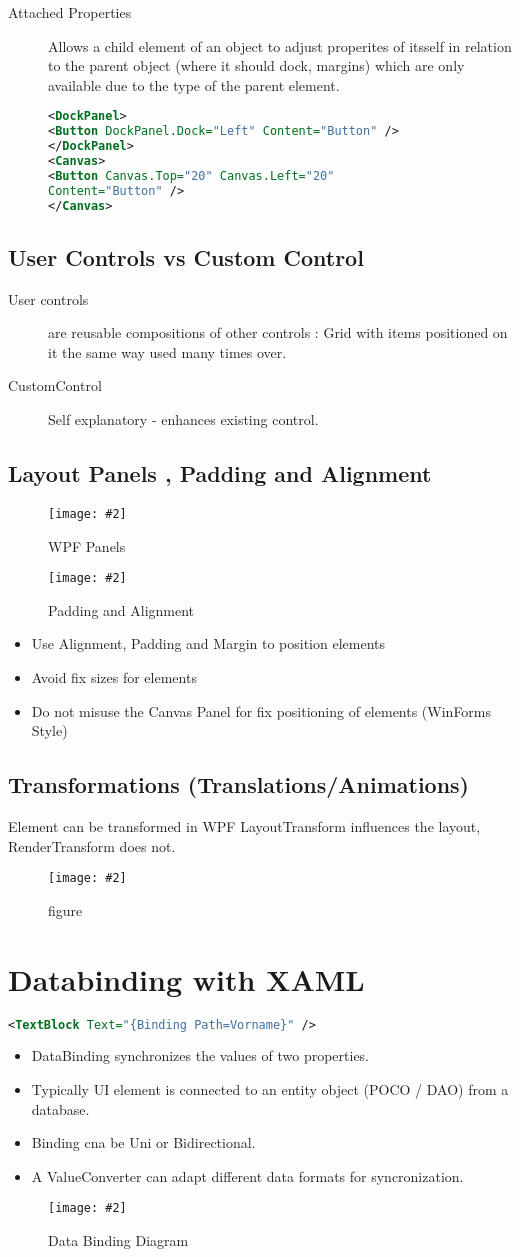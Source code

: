\documentclass[a4paper,10pt]{scrreprt}
\newcommand{\pic}[2][figure]{\begin{figure}[h]
 \centering
 \texttt{[image: \#2]}
 \caption{#1}
\end{figure}
}
\begin{document}
\begin{description}
\item[Attached Properties] Allows a child element of an object to adjust properites of itsself in relation to the parent object (where it should dock, margins) which are only available due to the type of the parent element.
\begin{lstlisting}[caption=XAML Attached Properties Example,language=xml]
<DockPanel>
<Button DockPanel.Dock="Left" Content="Button" />
</DockPanel>
<Canvas>
<Button Canvas.Top="20" Canvas.Left="20"
Content="Button" />
</Canvas>
\end{lstlisting}
\end{description}
\subsection{User Controls vs Custom Control}
\begin{description}
\item[User controls] are reusable compositions of other controls : Grid with items positioned on it the same way used many times over.
\item[CustomControl] Self explanatory - enhances existing control.
\end{description}
\subsection{Layout Panels , Padding and Alignment}
\pic[WPF Panels]{wlp.png}
\pic[Padding and Alignment]{pal.png}
\begin{itemize}
\item Use Alignment, Padding and Margin to position elements
\item Avoid fix sizes for elements
\item Do not misuse the Canvas Panel for fix positioning of elements (WinForms Style)
\end{itemize}
\subsection{Transformations (Translations/Animations)}
Element can be transformed in WPF
LayoutTransform influences the layout, RenderTransform does not.
\pic{tform.png}
\section{Databinding with XAML}
\begin{lstlisting}[language=xml]
<TextBlock Text="{Binding Path=Vorname}" />
\end{lstlisting}
\begin{itemize}
\item DataBinding synchronizes the values of two properties.
\item Typically UI element is connected to an entity object (POCO / DAO) from a database.
\item Binding cna be Uni or Bidirectional.
\item A ValueConverter can adapt different data formats for syncronization.
\end{itemize}
\pic[Data Binding Diagram]{dbind.png}
\end{document}
